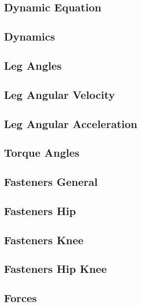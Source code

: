 \subsection{Dynamic Equation}

\subsection{Dynamics}

\subsection{Leg Angles}

\subsection{Leg Angular Velocity}

\subsection{Leg Angular Acceleration}

\subsection{Torque Angles}

\subsection{Fasteners General}

\subsection{Fasteners Hip}

\subsection{Fasteners Knee}

\subsection{Fasteners Hip Knee}

\subsection{Forces}

